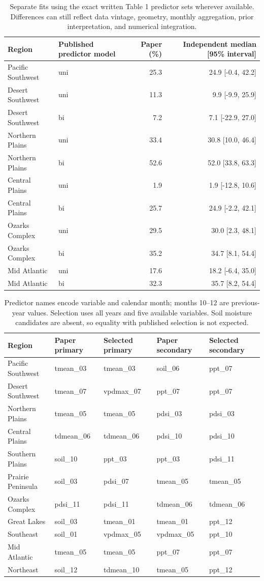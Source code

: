 \documentclass[11pt]{article}
\begin{document}
\begin{table}[H]\centering\small\begin{tabular}{llrr}\toprule Region & Published predictor model & Paper (\%) & Independent median [95\% interval]\\\midrule
Pacific Southwest & uni & 25.3 & 24.9 [-0.4, 42.2] \\
Desert Southwest & uni & 11.3 & 9.9 [-9.9, 25.9] \\
Desert Southwest & bi & 7.2 & 7.1 [-22.9, 27.0] \\
Northern Plains & uni & 33.4 & 30.8 [10.0, 46.4] \\
Northern Plains & bi & 52.6 & 52.0 [33.8, 63.3] \\
Central Plains & uni & 1.9 & 1.9 [-12.8, 10.6] \\
Central Plains & bi & 25.7 & 24.9 [-2.2, 42.1] \\
Ozarks Complex & uni & 29.5 & 30.0 [2.3, 48.1] \\
Ozarks Complex & bi & 35.2 & 34.7 [8.1, 54.4] \\
Mid Atlantic & uni & 17.6 & 18.2 [-6.4, 35.0] \\
Mid Atlantic & bi & 32.3 & 35.7 [8.2, 54.4] \\
\bottomrule\end{tabular}\caption{Separate fits using the exact written Table 1 predictor sets wherever available. Differences can still reflect data vintage, geometry, monthly aggregation, prior interpretation, and numerical integration.}\end{table}
\begin{table}[H]\centering\scriptsize\begin{tabular}{lllll}\toprule Region & Paper primary & Selected primary & Paper secondary & Selected secondary\\\midrule
Pacific Southwest & tmean\_03 & tmean\_03 & soil\_06 & ppt\_07 \\
Desert Southwest & tmean\_07 & vpdmax\_07 & ppt\_07 & ppt\_07 \\
Northern Plains & tmean\_05 & tmean\_05 & pdsi\_03 & pdsi\_03 \\
Central Plains & tdmean\_06 & tdmean\_06 & pdsi\_10 & pdsi\_10 \\
Southern Plains & soil\_10 & ppt\_03 & ppt\_03 & pdsi\_11 \\
Prairie Peninsula & soil\_03 & pdsi\_07 & tmean\_05 & tmean\_05 \\
Ozarks Complex & pdsi\_11 & pdsi\_11 & tdmean\_06 & tdmean\_06 \\
Great Lakes & soil\_03 & tmean\_01 & tmean\_01 & ppt\_12 \\
Southeast & soil\_01 & vpdmax\_05 & vpdmax\_05 & ppt\_10 \\
Mid Atlantic & tmean\_05 & tmean\_05 & ppt\_07 & ppt\_07 \\
Northeast & soil\_12 & tdmean\_10 & tmean\_05 & ppt\_12 \\
\bottomrule\end{tabular}\caption{Predictor names encode variable and calendar month; months 10--12 are previous-year values. Selection uses all years and five available variables. Soil moisture candidates are absent, so equality with published selection is not expected.}\end{table}
\end{document}
